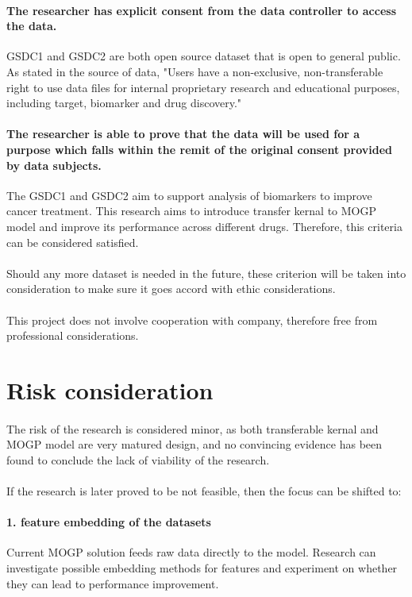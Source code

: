 \documentclass{article}
\begin{document}
\paragraph{The researcher has explicit consent from the data controller to access the data.} GSDC1 and GSDC2 are both open source dataset that is open to general public. As stated in the source of data, "Users have a non-exclusive, non-transferable right to use data files for internal proprietary research and educational purposes, including target, biomarker and drug discovery."
\paragraph{The researcher is able to prove that the data will be used for a purpose which falls within the remit of the original consent provided by data subjects.} The GSDC1 and GSDC2 aim to support analysis of biomarkers to improve cancer treatment. This research aims to introduce transfer kernal to MOGP model and improve its performance across different drugs. Therefore, this criteria can be considered satisfied.

\paragraph{}
Should any more dataset is needed in the future, these criterion will be taken into consideration to make sure it goes accord with ethic considerations.
\paragraph{}
This project does not involve cooperation with company, therefore free from professional considerations.
\section{Risk consideration}
\paragraph{}
The risk of the research is considered minor, as both transferable kernal and MOGP model are very matured design, and no convincing evidence has been found to conclude the lack of viability of the research.
\paragraph{}
If the research is later proved to be not feasible, then the focus can be shifted to:
\paragraph{1. feature embedding of the datasets} Current MOGP solution feeds raw data directly to the model. Research can investigate possible embedding methods for features and experiment on whether they can lead to performance improvement.
\end{document}
